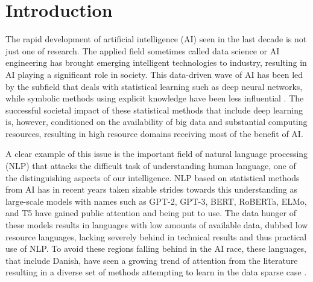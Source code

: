 \documentclass[main.tex]{subfiles}
\begin{document}
\chapter{Introduction}
The rapid development of artificial intelligence (AI) seen in the last decade is not just one of research.
The applied field sometimes called data science or AI engineering has brought emerging intelligent technologies to industry, resulting in AI playing a significant role in society.
This data-driven wave of AI has been led by the subfield that deals with statistical learning such as deep neural networks, while symbolic methods using explicit knowledge have been less influential \cite[p. 1]{lecun2015deep}.
The successful societal impact of these statistical methods that include deep learning is, however, conditioned on the availability of big data and substantial computing resources, resulting in high resource domains receiving most of the benefit of AI.

A clear example of this issue is the important field of natural language processing (NLP) that attacks the difficult task of understanding human language, one of the distinguishing aspects of our intelligence.
NLP based on statistical methods from AI has in recent years taken sizable strides towards this understanding as large-scale models with names such as GPT-2, GPT-3, BERT, RoBERTa, ELMo, and T5 have gained public attention and being put to use.
The data hunger of these models results in languages with low amounts of available data, dubbed low resource languages, lacking severely behind in technical results and thus practical use of NLP.
To avoid these regions falling behind in the AI race, these languages, that include Danish, have seen a growing trend of attention from the literature resulting in a diverse set of methods attempting to learn in the data sparse case \cite{hedderich2021survey}.
\end{document}
